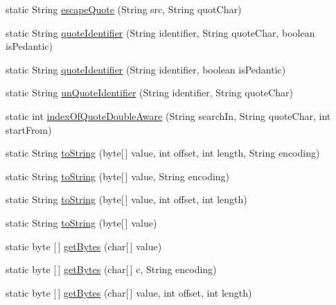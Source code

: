 \begin{DoxyCompactItemize}
\item 
static String \mbox{\hyperlink{classcom_1_1mysql_1_1cj_1_1util_1_1_string_utils_af537620e8a64cf0e1ca40676ca3304bc}{escape\+Quote}} (String src, String quot\+Char)
\item 
static String \mbox{\hyperlink{classcom_1_1mysql_1_1cj_1_1util_1_1_string_utils_a6dc94c9c54c7fe3fafd33cc4d3092ee1}{quote\+Identifier}} (String identifier, String quote\+Char, boolean is\+Pedantic)
\item 
static String \mbox{\hyperlink{classcom_1_1mysql_1_1cj_1_1util_1_1_string_utils_a5ed6d2efb949820c7dc4f24321a42ce6}{quote\+Identifier}} (String identifier, boolean is\+Pedantic)
\item 
static String \mbox{\hyperlink{classcom_1_1mysql_1_1cj_1_1util_1_1_string_utils_aa60f98a2192f4a10b89107f243fd186a}{un\+Quote\+Identifier}} (String identifier, String quote\+Char)
\item 
static int \mbox{\hyperlink{classcom_1_1mysql_1_1cj_1_1util_1_1_string_utils_a2cf45bcafe40519b947e8f0a484d5fbd}{index\+Of\+Quote\+Double\+Aware}} (String search\+In, String quote\+Char, int start\+From)
\item 
static String \mbox{\hyperlink{classcom_1_1mysql_1_1cj_1_1util_1_1_string_utils_a9e0937d1a6aa36ba315334689fa5aa51}{to\+String}} (byte\mbox{[}$\,$\mbox{]} value, int offset, int length, String encoding)
\item 
static String \mbox{\hyperlink{classcom_1_1mysql_1_1cj_1_1util_1_1_string_utils_a9be26e84e45f9349c1de373240562f69}{to\+String}} (byte\mbox{[}$\,$\mbox{]} value, String encoding)
\item 
static String \mbox{\hyperlink{classcom_1_1mysql_1_1cj_1_1util_1_1_string_utils_a527b0246e4a34b2c2bd93a589dc36dee}{to\+String}} (byte\mbox{[}$\,$\mbox{]} value, int offset, int length)
\item 
static String \mbox{\hyperlink{classcom_1_1mysql_1_1cj_1_1util_1_1_string_utils_aa770678b56757ab1c7a91ffe523dcd7e}{to\+String}} (byte\mbox{[}$\,$\mbox{]} value)
\item 
static byte \mbox{[}$\,$\mbox{]} \mbox{\hyperlink{classcom_1_1mysql_1_1cj_1_1util_1_1_string_utils_a8511f19038629bb79919340b70bf263b}{get\+Bytes}} (char\mbox{[}$\,$\mbox{]} value)
\item 
static byte \mbox{[}$\,$\mbox{]} \mbox{\hyperlink{classcom_1_1mysql_1_1cj_1_1util_1_1_string_utils_a8967b073f47b3abc09e87db0874b5be9}{get\+Bytes}} (char\mbox{[}$\,$\mbox{]} c, String encoding)
\item 
static byte \mbox{[}$\,$\mbox{]} \mbox{\hyperlink{classcom_1_1mysql_1_1cj_1_1util_1_1_string_utils_aac95e17a8ab0cd549b796ca78408a1ca}{get\+Bytes}} (char\mbox{[}$\,$\mbox{]} value, int offset, int length)

\end{DoxyCompactItemize}
